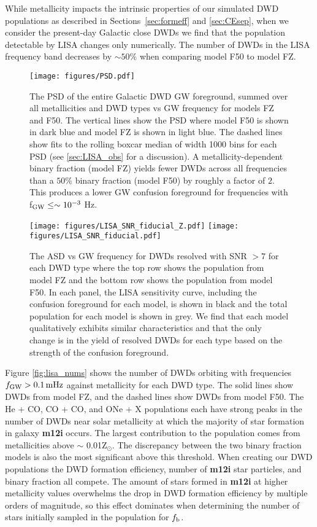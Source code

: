 \documentclass[twocolumn, linenumbers]{aastex631}
\begin{document}
While metallicity impacts the intrinsic properties of our simulated DWD populations as described in Sections~\ref{sec:formeff} and \ref{sec:CEsep}, when we consider the present-day Galactic close DWDs we find that the population detectable by LISA changes only numerically. The number of DWDs in the LISA frequency band decreases by $\sim50\%$ when comparing model F50 to model FZ.


\begin{figure}
	\texttt{[image: figures/PSD.pdf]}
    \caption{The PSD of the entire Galactic DWD GW foreground, summed over all metallicities and DWD types vs GW frequency for models FZ and F50. The vertical lines show the PSD where model F50 is shown in dark blue and model FZ is shown in light blue. The dashed lines show fits to the rolling boxcar median of width 1000 bins for each PSD (see \ref{sec:LISA_obs} for a discussion). A metallicity-dependent binary fraction (model FZ) yields fewer DWDs across all frequencies than a $50\%$ binary fraction (model F50) by roughly a factor of $2$. This produces a lower GW confusion foreground for frequencies with f$_{\rm{GW}}\leq\sim10^{-3}$ Hz.}
    \label{fig:PSD}
\end{figure}


\begin{figure*}
	\texttt{[image: figures/LISA\_SNR\_fiducial\_Z.pdf]}
	\texttt{[image: figures/LISA\_SNR\_fiducial.pdf]}
    \caption{The ASD vs GW frequency for DWDs resolved with SNR $> 7$ for each DWD type where the top row shows the population from model FZ and the bottom row shows the population from model F50. In each panel, the LISA sensitivity curve, including the confusion foreground for each model, is shown in black and the total population for each model is shown in grey. We find that each model qualitatively exhibits similar characteristics and that the only change is in the yield of resolved DWDs for each type based on the strength of the confusion foreground.}
    \label{fig:LISA_SNR}
\end{figure*}

Figure \ref{fig:lisa_nums} shows the number of DWDs orbiting with frequencies $f_{\rm{GW}} > 0.1\,\rm{mHz}$ against metallicity for each DWD type. The solid lines show DWDs from model FZ, and the dashed lines show DWDs from model F50. The He + CO, CO + CO, and ONe + X populations each have strong peaks in the number of DWDs near solar metallicity at which the majority of star formation in galaxy {\bf{m12i}} occurs. The largest contribution to the population comes from metallicities above $\sim$ 0.01Z$_\odot$. The discrepancy between the two binary fraction models is also the most significant above this threshold. When creating our DWD populations the DWD formation efficiency, number of \textbf{m12i} star particles, and binary fraction all compete. The amount of stars formed in \textbf{m12i} at higher metallicity values overwhelms the drop in DWD formation efficiency by multiple orders of magnitude, so this effect dominates when determining the number of stars initially sampled in the population for $f_{\rm{b}}$. 
\end{document}

